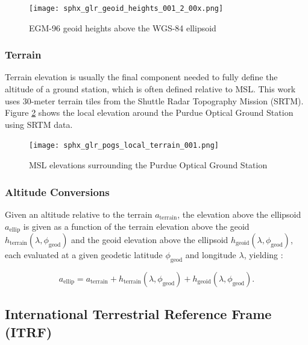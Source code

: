 \begin{figure}[ht]
  \centering
  \texttt{[image: sphx\_glr\_geoid\_heights\_001\_2\_00x.png]}
  \caption{EGM-96 geoid heights above the WGS-84 ellipsoid}
  \label{fig:geoid_shape}
\end{figure}

\subsubsection{Terrain}

Terrain elevation is usually the final component needed to fully define the altitude of a ground station, which is often defined relative to MSL. This work uses $30$-meter terrain tiles from the Shuttle Radar Topography Mission (SRTM). Figure \ref{fig:pogs_terrain} shows the local elevation around the Purdue Optical Ground Station using SRTM data.

\begin{figure}[ht]
  \centering
  \texttt{[image: sphx\_glr\_pogs\_local\_terrain\_001.png]}
  \caption{MSL elevations surrounding the Purdue Optical Ground Station}
  \label{fig:pogs_terrain}
\end{figure}

\subsubsection{Altitude Conversions}

Given an altitude relative to the terrain $a_\mathrm{terrain}$, the elevation above the ellipsoid $a_\mathrm{ellip}$ is given as a function of the terrain elevation above the geoid $h_\mathrm{terrain}(\lambda, \phi_\mathrm{geod})$ and the geoid elevation above the ellipsoid $h_\mathrm{geoid}(\lambda, \phi_\mathrm{geod})$, each evaluated at a given geodetic latitude $\phi_\mathrm{geod}$ and longitude $\lambda$, yielding \cite{vallado4ed}:

\begin{equation} \label{eq:altitude_above_ellipsoid}
  a_\mathrm{ellip} = a_\mathrm{terrain} + h_\mathrm{terrain}(\lambda, \phi_\mathrm{geod}) + h_\mathrm{geoid}(\lambda, \phi_\mathrm{geod}).
\end{equation}

\subsection{International Terrestrial Reference Frame (ITRF)}

